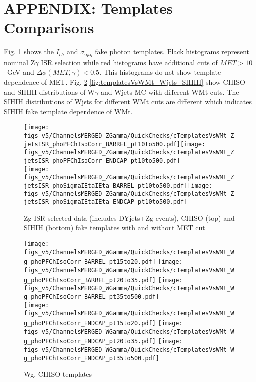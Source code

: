 \section{APPENDIX: Templates Comparisons}
\label{sec:CompareTemplatesPlots}

Fig. \ref{fig:templatesVsWMt_Zg_CHISO_fake} shows the $I_{ch}$ and $\sigma_{i\eta i\eta}$ fake photon templates. Black histograms represent nominal Z$\gamma$ ISR selection while red histograms have additional cuts of $MET>10$~GeV and $\Delta \phi(MET,\gamma)<0.5$. This histograms do not show template dependence of MET. Fig. \ref{fig:templatesVsWMt_Wg_CHISO}-\ref{fig:templatesVsWMt_Wjets_SIHIH} show CHISO and SIHIH distributions of W$\gamma$ and Wjets MC with different WMt cuts. The SIHIH distributions of Wjets for different WMt cuts are different which indicates SIHIH fake template dependence of WMt.\\

\begin{figure}[htb]
  \begin{center}
  \texttt{[image: figs\_v5/ChannelsMERGED\_ZGamma/QuickChecks/cTemplatesVsWMt\_ZjetsISR\_phoPFChIsoCorr\_BARREL\_pt10to500.pdf]}\texttt{[image: figs\_v5/ChannelsMERGED\_ZGamma/QuickChecks/cTemplatesVsWMt\_ZjetsISR\_phoPFChIsoCorr\_ENDCAP\_pt10to500.pdf]}\\
  \texttt{[image: figs\_v5/ChannelsMERGED\_ZGamma/QuickChecks/cTemplatesVsWMt\_ZjetsISR\_phoSigmaIEtaIEta\_BARREL\_pt10to500.pdf]}\texttt{[image: figs\_v5/ChannelsMERGED\_ZGamma/QuickChecks/cTemplatesVsWMt\_ZjetsISR\_phoSigmaIEtaIEta\_ENDCAP\_pt10to500.pdf]}\\
  \caption{Zg ISR-selected data (includes DYjets+Zg events), CHISO (top) and SIHIH (bottom) fake templates with and without MET cut}
  \label{fig:templatesVsWMt_Zg_CHISO_fake}
  \end{center}
\end{figure}

\begin{figure}[htb]
  \begin{center}
  \texttt{[image: figs\_v5/ChannelsMERGED\_WGamma/QuickChecks/cTemplatesVsWMt\_Wg\_phoPFChIsoCorr\_BARREL\_pt15to20.pdf]} \texttt{[image: figs\_v5/ChannelsMERGED\_WGamma/QuickChecks/cTemplatesVsWMt\_Wg\_phoPFChIsoCorr\_BARREL\_pt20to35.pdf]} \texttt{[image: figs\_v5/ChannelsMERGED\_WGamma/QuickChecks/cTemplatesVsWMt\_Wg\_phoPFChIsoCorr\_BARREL\_pt35to500.pdf]}\\
  \texttt{[image: figs\_v5/ChannelsMERGED\_WGamma/QuickChecks/cTemplatesVsWMt\_Wg\_phoPFChIsoCorr\_ENDCAP\_pt15to20.pdf]} \texttt{[image: figs\_v5/ChannelsMERGED\_WGamma/QuickChecks/cTemplatesVsWMt\_Wg\_phoPFChIsoCorr\_ENDCAP\_pt20to35.pdf]} \texttt{[image: figs\_v5/ChannelsMERGED\_WGamma/QuickChecks/cTemplatesVsWMt\_Wg\_phoPFChIsoCorr\_ENDCAP\_pt35to500.pdf]}\\
  \caption{Wg, CHISO templates}
  \label{fig:templatesVsWMt_Wg_CHISO}
  \end{center}
\end{figure}


